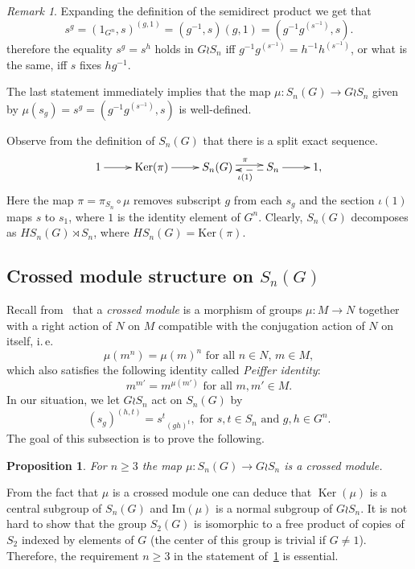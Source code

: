 \documentclass[oneside, 10pt]{amsart}
\theoremstyle{plain}
\numberwithin{equation}{section}
\numberwithin{lemma}{section}
\newtheorem{prop}[lemma]{Proposition}
\theoremstyle{remark}
\newtheorem{rem}[lemma]{Remark}
\theoremstyle{definition}
\DeclareMathOperator{\Ker}{Ker}
\begin{document}
\begin{rem}
Expanding the definition of the semidirect product we get that
\begin{equation} \nonumber s^g = (1_{G^n}, s)^{(g, 1)} = (g^{-1}, s) (g, 1) = (g^{-1} g^{(s^{-1})}, s). \end{equation}
therefore the equality $s^g = s^h$ holds in $G \wr S_n$ iff
$g^{-1} g^{(s^{-1})} = h^{-1} h^{(s^{-1})}$, or what is the same, iff $s$ fixes $hg^{-1}$.

The last statement immediately implies that the map $\mu \colon S_n(G) \to G \wr S_n$ given by $\mu(s_g) = s^g = (g^{-1}g^{(s^{-1})}, s)$ is well-defined.
\end{rem}

Observe from the definition of $S_n(G)$ that there is a split exact sequence.
\begin{equation} \label{eq:ex-seq} \xymatrix{1 \ar[r] & \mathrm{Ker}(\pi) \ar[r] &  S_n(G) \ar@<0.5ex>[r]^{\pi} & S_n \ar[r] \ar@{-->}@<0.5ex>[l]^{\iota(1)} & 1,} \end{equation}
Here the map $\pi = \pi_{S_n} \circ \mu$ removes subscript $g$ from each $s_g$ and the section $\iota(1)$ maps $s$ to $s_1$, where $1$ is the identity element of $G^n$.
Clearly, $S_n(G)$ decomposes as $HS_n(G) \rtimes S_n$, where $HS_n(G) = \mathrm{Ker}(\pi)$.

\subsection{Crossed module structure on $S_n(G)$}
Recall from~\cite[\S~2.2]{BHS11} that a {\it crossed module} is a morphism of groups $\mu\colon M\to N$ together with a right action of $N$ on $M$ 
compatible with the conjugation action of $N$ on itself, i.\,e.
\begin{equation} \label{eq:precrossed} \tag{CM1} \mu(m^n) = \mu(m)^n \text{ for all $n \in N$, $m \in M$}, \end{equation}
which also satisfies the following identity called {\it Peiffer identity}:
\begin{equation} \label{eq:Peiffer} \tag{CM2} m^{m'} = m^{\mu(m')} \text{ for all $m, m' \in M$}.\end{equation}
In our situation, we let $G \wr S_n$ act on $S_n(G)$ by 
\begin{equation} \label{eq:action} (s_g)^{(h, t)} = {s^t}_{(gh)^t}, \text{ for $s, t \in S_n$ and $g, h \in G^n$.} \end{equation}
The goal of this subsection is to prove the following.
\begin{prop} \label{thm:cms} For $n \geq 3$ the map $\mu \colon S_n(G) \to G \wr S_n $ is a crossed module. \end{prop}
From the fact that $\mu$ is a crossed module one can deduce that $\Ker(\mu)$ is a central subgroup of $S_n(G)$ and $\mathrm{Im}(\mu)$ is a normal subgroup of $G \wr S_n$.
It is not hard to show that the group $S_2(G)$ is isomorphic to a free product of copies of $S_2$ indexed by elements of $G$ 
 (the center of this group is trivial if $G\neq 1$).
Therefore, the requirement $n\geq 3$ in the statement of~\cref{thm:cms} is essential.
\end{document}
